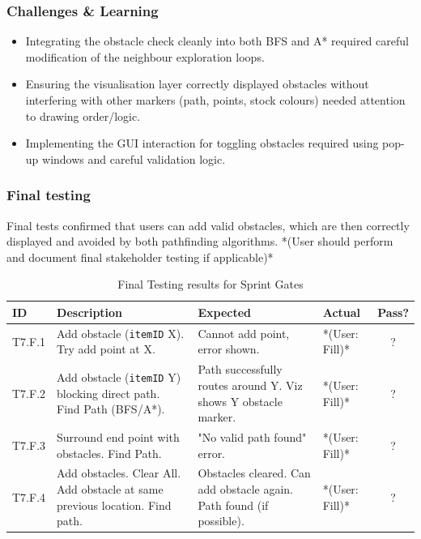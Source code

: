 \subsubsection{Challenges \& Learning}
\begin{itemize}
	\item Integrating the obstacle check cleanly into both BFS and A* required careful modification of the neighbour exploration loops.
	\item Ensuring the visualisation layer correctly displayed obstacles without interfering with other markers (path, points, stock colours) needed attention to drawing order/logic.
	\item Implementing the GUI interaction for toggling obstacles required using pop-up windows and careful validation logic.
\end{itemize}

\subsubsection{Final testing}
Final tests confirmed that users can add valid obstacles, which are then correctly displayed and avoided by both pathfinding algorithms.
*(User should perform and document final stakeholder testing if applicable)*

\begin{table}[htbp] %
	\centering
	\begin{tabularx}{\textwidth}{|l|X|p{3.5cm}|p{3.5cm}|c|}
		\hline
		\textbf{ID} & \textbf{Description} & \textbf{Expected} & \textbf{Actual} & \textbf{Pass?} \\
		\hline
		T7.F.1 & Add obstacle (\verb|itemID| X). Try add point at X. & Cannot add point, error shown. & *(User: Fill)* & ? \\
		\hline
		T7.F.2 & Add obstacle (\verb|itemID| Y) blocking direct path. Find Path (BFS/A*). & Path successfully routes around Y. Viz shows Y obstacle marker. & *(User: Fill)* & ? \\
		\hline
		T7.F.3 & Surround end point with obstacles. Find Path. & "No valid path found" error. & *(User: Fill)* & ? \\
		\hline
		T7.F.4 & Add obstacles. Clear All. Add obstacle at same previous location. Find path. & Obstacles cleared. Can add obstacle again. Path found (if possible). & *(User: Fill)* & ? \\
		\hline
	\end{tabularx}
	\caption{Final Testing results for Sprint Gates}
\end{table}

